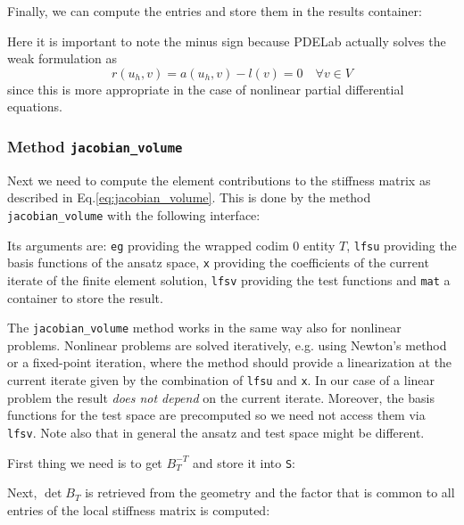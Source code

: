 \documentclass[a4paper,12pt]{article}
\begin{document}
Finally, we can compute the entries and store them in the results container:

Here it is important to note the minus sign because PDELab
actually solves the weak formulation as 
$$r(u_h,v) = a(u_h,v)-l(v) = 0 \quad \forall v\in V$$
since this is more appropriate in the case of nonlinear partial
differential equations.

\subsubsection*{Method \lstinline{jacobian_volume}}

Next we need to compute the element contributions to the 
stiffness matrix as described in Eq.\eqref{eq:jacobian_volume}.
This is done by the method \lstinline{jacobian_volume} with
the following interface:

Its arguments are: \lstinline{eg} providing the wrapped codim 0 entity $T$,
\lstinline{lfsu} providing the basis functions of the ansatz space,
\lstinline{x} providing the coefficients of the current iterate 
of the finite element solution, \lstinline{lfsv} providing the test functions
and \lstinline{mat} a container to store the result.

The \lstinline{jacobian_volume} method works in the same way also for nonlinear
problems. Nonlinear problems are solved iteratively, e.g. using Newton's method
or a fixed-point iteration, where the method should provide a linearization
at the current iterate given by the combination of \lstinline{lfsu} and \lstinline{x}.
In our case of a linear problem the result {\em does not depend} on the current iterate.
Moreover, the basis functions for the test space are precomputed so we need
not access them via \lstinline{lfsv}. Note also that in general the ansatz and
test space might be different.

First thing we need is to get $B_T^{-T}$ and store it into \lstinline{S}:


Next, $\det B_T$ is retrieved from the geometry and
the factor that is common to all entries of the local stiffness matrix is computed:

\end{document}
